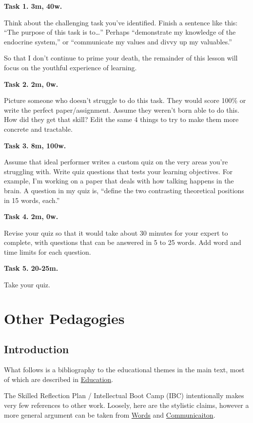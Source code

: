 \documentclass[
]{book}
\begin{document}
\textbf{Task 1. 3m, 40w.}

Think about the challenging task you've identified.
Finish a sentence like this:
``The purpose of this task is to\ldots{}''
Perhaps ``demonstrate my knowledge of the endocrine system,'' or
``communicate my values and divvy up my valuables.''

So that I don't continue to prime your death, the remainder of this lesson will focus on the youthful experience of learning.

\textbf{Task 2. 2m, 0w.}

Picture someone who doesn't struggle to do this task.
They would score 100\% or write the perfect paper/assignment.
Assume they weren't born able to do this.
How did they get that skill?
Edit the same 4 things to try to make them more concrete and tractable.

\textbf{Task 3. 8m, 100w.}

Assume that ideal performer writes a custom quiz on
the very areas you're struggling with.
Write quiz questions that tests your learning objectives.
For example, I'm working on a paper that deals with
how talking happens in the brain.
A question in my quiz is, ``define the two contrasting theoretical
positions in 15 words, each.''

\textbf{Task 4. 2m, 0w.}

Revise your quiz so that it would take about 30 minutes for your expert to complete, with questions that can be answered in 5 to 25 words.
Add word and time limits for each question.

\textbf{Task 5. 20-25m.}

Take your quiz.

\chapter{Other Pedagogies}\label{other-pedagogies}

\section{Introduction}\label{introduction-1}

What follows is a bibliography to the educational themes in the main text, most of which are described in \hyperref[education]{Education}.

The Skilled Reflection Plan / Intellectual Boot Camp (IBC) intentionally makes very few references to other work. Loosely, here are the stylistic claims, however a more general argument can be taken from \hyperref[words]{Words} and \hyperref[communication]{Communicaiton}.
\end{document}
